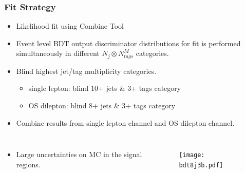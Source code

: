 \documentclass{beamer}
\begin{document}
\begin{frame}
\frametitle{Fit Strategy}
\begin{itemize}
\vspace{0pt}
	\item Likelihood fit using Combine Tool

	\item Event level BDT output discriminator distributions for fit is performed simultaneously in different $N_{j} \otimes N_{tags}^{M}$ categories.

	\item Blind highest jet/tag multiplicity categories. \begin{itemize}
		\item single lepton: blind 10+ jets \& 3+ tags category
		\item OS dilepton: blind 8+ jets \& 3+ tags category\end{itemize}

	\item Combine results from single lepton channel and OS dilepton channel.
\end{itemize}
\begin{columns}
\begin{itemize}
\item Large uncertainties on MC in the signal regions.
\end{itemize}
\begin{figure}
\texttt{[image: bdt8j3b.pdf]}
\end{figure}
\end{columns}
\end{frame}

\end{document}
